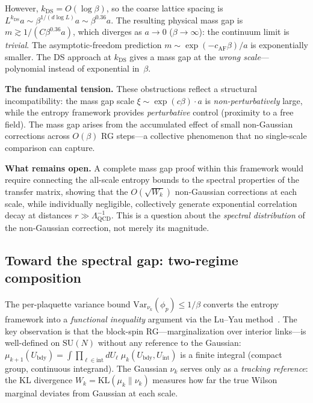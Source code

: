 \documentclass[11pt]{article}
\theoremstyle{definition}
\newcommand{\KL}{\mathrm{KL}}
\newcommand{\Var}{\mathrm{Var}}
\begin{document}
However, $k_{\mathrm{DS}} = O(\log\beta)$, so the coarse lattice spacing 
is $L^{k_{\mathrm{DS}}} a \sim \beta^{1/(d\log L)} a \sim \beta^{0.36} a$.  
The resulting physical mass gap is 
$m \gtrsim 1/(C\beta^{0.36} a)$, which diverges as $a \to 0$ 
($\beta \to \infty$): the continuum limit is \emph{trivial}.  
The asymptotic-freedom prediction $m \sim \exp(-c_{\mathrm{AF}}\beta)/a$ 
is exponentially smaller.  The DS approach at $k_{\mathrm{DS}}$ 
gives a mass gap at the \emph{wrong scale}---polynomial instead 
of exponential in~$\beta$.

\textbf{The fundamental tension.}
These obstructions reflect a structural incompatibility: the 
mass gap scale $\xi \sim \exp(c\beta) \cdot a$ is 
\emph{non-perturbatively} large, while the entropy framework 
provides \emph{perturbative} control (proximity to a free field).  
The mass gap arises from the accumulated effect of small non-Gaussian 
corrections across $O(\beta)$ RG steps---a collective phenomenon 
that no single-scale comparison can capture.

\textbf{What remains open.}
A complete mass gap proof within this framework would require 
connecting the all-scale entropy bounds to the spectral properties 
of the transfer matrix, showing that the $O(\sqrt{W_k})$ 
non-Gaussian corrections at each scale, while individually negligible, 
collectively generate exponential correlation decay at distances 
$r \gg \Lambda_{\mathrm{QCD}}^{-1}$.  This is a question about the 
\emph{spectral distribution} of the non-Gaussian correction, 
not merely its magnitude.

\subsection{Toward the spectral gap: two-regime composition}\label{sec:luyau}

The per-plaquette variance bound $\Var_{\nu_k}(\phi_p) \leq 1/\beta$ 
converts the entropy framework into a \emph{functional inequality} 
argument via the Lu--Yau method~\cite{lu_yau}.  The key observation 
is that the block-spin RG---marginalization over interior links---is 
well-defined on $\mathrm{SU}(N)$ without any reference to the 
Gaussian: $\mu_{k+1}(U_{\mathrm{bdy}}) = \int \prod_{\ell \in 
\mathrm{int}} dU_\ell\;\mu_k(U_{\mathrm{bdy}}, U_{\mathrm{int}})$ 
is a finite integral (compact group, continuous integrand).  The 
Gaussian $\nu_k$ serves only as a \emph{tracking reference}: the KL 
divergence $W_k = \KL(\mu_k \| \nu_k)$ measures how far the true 
Wilson marginal deviates from Gaussian at each scale.
\end{document}
